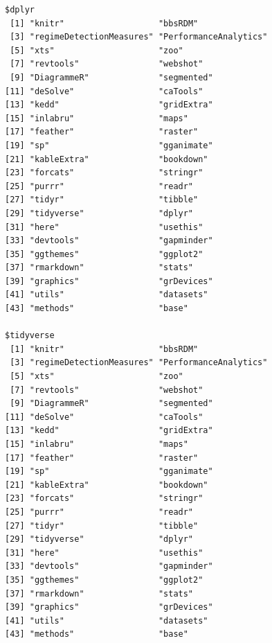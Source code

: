 \documentclass[12pt,twoside,openany]{reedthesis}
\begin{document}
\begin{verbatim}
$dplyr
 [1] "knitr"                   "bbsRDM"                 
 [3] "regimeDetectionMeasures" "PerformanceAnalytics"   
 [5] "xts"                     "zoo"                    
 [7] "revtools"                "webshot"                
 [9] "DiagrammeR"              "segmented"              
[11] "deSolve"                 "caTools"                
[13] "kedd"                    "gridExtra"              
[15] "inlabru"                 "maps"                   
[17] "feather"                 "raster"                 
[19] "sp"                      "gganimate"              
[21] "kableExtra"              "bookdown"               
[23] "forcats"                 "stringr"                
[25] "purrr"                   "readr"                  
[27] "tidyr"                   "tibble"                 
[29] "tidyverse"               "dplyr"                  
[31] "here"                    "usethis"                
[33] "devtools"                "gapminder"              
[35] "ggthemes"                "ggplot2"                
[37] "rmarkdown"               "stats"                  
[39] "graphics"                "grDevices"              
[41] "utils"                   "datasets"               
[43] "methods"                 "base"                   

$tidyverse
 [1] "knitr"                   "bbsRDM"                 
 [3] "regimeDetectionMeasures" "PerformanceAnalytics"   
 [5] "xts"                     "zoo"                    
 [7] "revtools"                "webshot"                
 [9] "DiagrammeR"              "segmented"              
[11] "deSolve"                 "caTools"                
[13] "kedd"                    "gridExtra"              
[15] "inlabru"                 "maps"                   
[17] "feather"                 "raster"                 
[19] "sp"                      "gganimate"              
[21] "kableExtra"              "bookdown"               
[23] "forcats"                 "stringr"                
[25] "purrr"                   "readr"                  
[27] "tidyr"                   "tibble"                 
[29] "tidyverse"               "dplyr"                  
[31] "here"                    "usethis"                
[33] "devtools"                "gapminder"              
[35] "ggthemes"                "ggplot2"                
[37] "rmarkdown"               "stats"                  
[39] "graphics"                "grDevices"              
[41] "utils"                   "datasets"               
[43] "methods"                 "base"                   


\end{verbatim}
\end{document}
